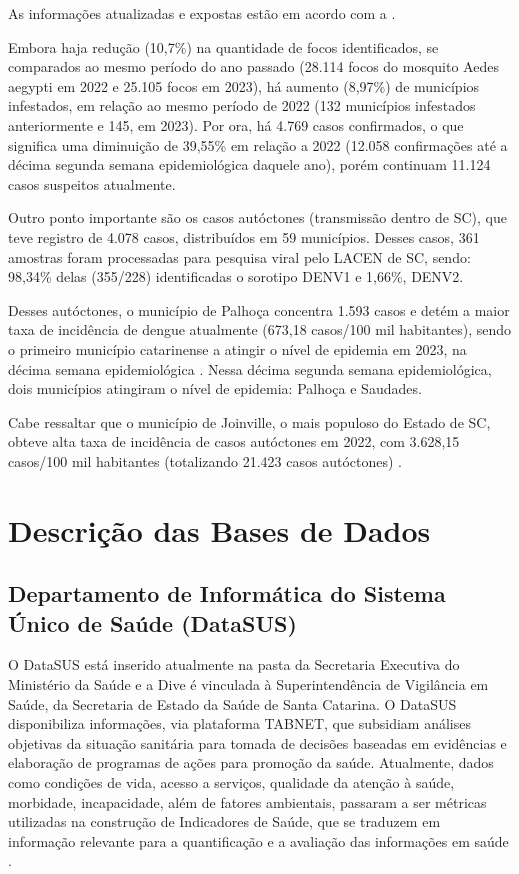 \indent As informações atualizadas e expostas estão em acordo com a .

\indent Embora haja redução (10,7\%) na quantidade de focos identificados, se comparados ao mesmo período do ano passado (28.114 focos do mosquito Aedes aegypti em 2022 e 25.105 focos em 2023), há aumento (8,97\%) de municípios infestados, em relação ao mesmo período de 2022 (132 municípios infestados anteriormente e 145, em 2023). Por ora, há 4.769 casos confirmados, o que significa uma diminuição de 39,55\% em relação a 2022 (12.058 confirmações até a décima segunda semana epidemiológica daquele ano), porém continuam 11.124 casos suspeitos atualmente.

\indent Outro ponto importante são os casos autóctones (transmissão dentro de \acrlong{SC}), que teve registro de 4.078 casos, distribuídos em 59 municípios. Desses casos, 361 amostras foram processadas para pesquisa viral pelo \acrfull{LACEN} de \acrlong{SC}, sendo: 98,34\% delas (355/228) identificadas o sorotipo DENV1 e 1,66\%, DENV2.

\indent Desses autóctones, o município de Palhoça concentra 1.593 casos e detém a maior taxa de incidência de dengue atualmente (673,18 casos/100 mil habitantes), sendo o primeiro município catarinense a atingir o nível de epidemia em 2023, na décima semana epidemiológica \cite{Informe6DiveSE10/23}. Nessa décima segunda semana epidemiológica, dois municípios atingiram o nível de epidemia: Palhoça e Saudades.

\indent Cabe ressaltar que o município de Joinville, o mais populoso do Estado de \acrlong{SC}, obteve alta taxa de incidência de casos autóctones em 2022, com 3.628,15 casos/100 mil habitantes (totalizando 21.423 casos autóctones) \cite{Informe31DiveSE52/22}.

\section{Descrição das Bases de Dados}

\subsection{Departamento de Informática do Sistema Único de Saúde (DataSUS)}

O \acrshort{DataSUS} está inserido atualmente na pasta da Secretaria Executiva do Ministério da Saúde e a \acrfull{Dive} é vinculada à Superintendência de Vigilância em Saúde, da Secretaria de Estado da Saúde de Santa Catarina. O \acrshort{DataSUS} disponibiliza informações, via plataforma TABNET, que subsidiam  análises objetivas da situação sanitária para tomada de decisões baseadas em evidências e elaboração de programas de ações para promoção da saúde. Atualmente, dados como condições de vida, acesso a serviços, qualidade da atenção à saúde, morbidade, incapacidade, além de fatores ambientais, passaram a ser métricas utilizadas na construção de Indicadores de Saúde, que se traduzem em informação relevante para a quantificação e a avaliação das informações em saúde \cite{TABNETMinisterio}.

